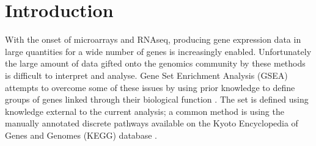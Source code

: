 \documentclass[12pt]{article} %
\begin{document}
%	
	
	\section{Introduction}	

	
	
	With the onset of microarrays and RNAseq, producing gene expression data in large quantities for a wide number of genes is increasingly enabled. Unfortunately the large amount of data gifted onto the genomics community by these methods is difficult to interpret and analyse. Gene Set Enrichment Analysis (GSEA) attempts to overcome some of these issues by using prior knowledge to define groups of genes linked through their biological function \cite{HejblumTimeCourseGeneSet2015}. The set is defined using knowledge external to the current analysis; a common method is using the manually annotated discrete pathways available on the Kyoto Encyclopedia of Genes and Genomes (KEGG) database \cite{FridleyGenesetanalysis2011}.
	
\end{document}
